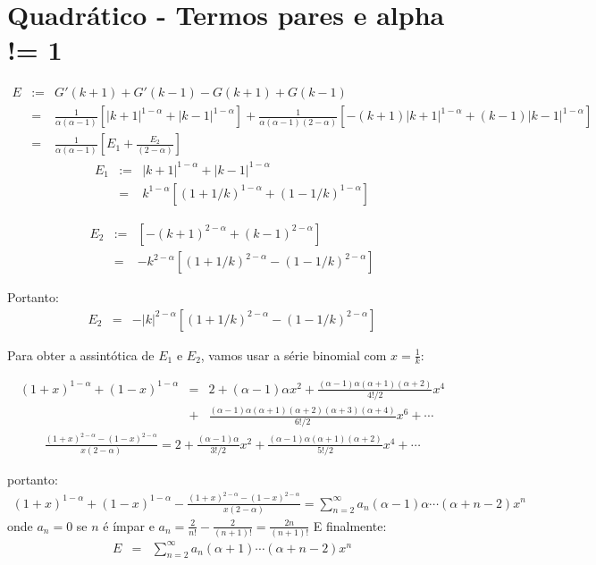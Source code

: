\documentclass[10pt,a4paper]{article}%
\begin{document}
\section{Quadrático - Termos pares e alpha != 1}
\begin{eqnarray*}
E&:=&  G'(k+1) + G'(k-1) - G(k+1) + G(k-1)\\
&=& \frac{1}{\alpha(\alpha-1)}\left[|k+1|^{1-\alpha} + |k-1|^{1-\alpha}\right] 
+ \frac{1}{\alpha(\alpha-1)(2-\alpha)}\left[-(k+1)|k+1|^{1-\alpha} + (k-1)|k-1|^{1-\alpha}\right]\\
&=& \frac{1}{\alpha(\alpha-1)}\left[E_1 + 
 \frac{E_2}{(2-\alpha)}\right]
\end{eqnarray*}
\begin{eqnarray*}
    E_1&:=&  |k+1|^{1-\alpha} + |k-1|^{1-\alpha}\\
&=&k^{1-\alpha}\left[(1+1/k)^{1-\alpha} + (1-1/k)^{1-\alpha}\right]
\end{eqnarray*}


\begin{eqnarray*}
    E_2&:=&  \left[-(k+1)^{2-\alpha} + (k-1)^{2-\alpha}\right]\\
    &=&-k^{2-\alpha}\left[(1+1/k)^{2-\alpha}-(1-1/k)^{2-\alpha}\right]
\end{eqnarray*}


Portanto:
\begin{eqnarray*}
    E_2
    &=&-|k|^{2-\alpha}\left[(1+1/k)^{2-\alpha}-(1-1/k)^{2-\alpha}\right]
\end{eqnarray*}


Para obter a assintótica de $E_1$ e $E_2$, vamos usar a série binomial com $x = \frac{1}{k}$:

\begin{eqnarray*}
    (1+x)^{1-\alpha} + (1-x)^{1-\alpha} &=& 2 + (\alpha - 1) \alpha x^2 + \frac{(\alpha - 1) \alpha (\alpha + 1) (\alpha + 2)}{4!/2} x^4\\ &+& \frac{(\alpha - 1) \alpha (\alpha + 1) (\alpha + 2) (\alpha + 3) (\alpha + 4)}{6!/2} x^6 +\cdots
\end{eqnarray*}
\begin{eqnarray*}
    \frac{(1+x)^{2-\alpha} -(1-x)^{2-\alpha}}{x(2-\alpha)} = 2 +\frac{(\alpha-1)\alpha}{3!/2}x^2 +\frac{(\alpha-1)\alpha(\alpha+1)(\alpha+2)}{5!/2}x^4 + \cdots
\end{eqnarray*}

portanto:
\begin{eqnarray*}
    (1+x)^{1-\alpha} + (1-x)^{1-\alpha} - \frac{(1+x)^{2-\alpha} - (1-x)^{2-\alpha}}{x(2-\alpha)} = \sum_{n=2}^\infty a_n(\alpha-1)\alpha\cdots (\alpha+n-2)x^n
\end{eqnarray*}
onde  $a_n=0$ se $n$ é ímpar e
$a_n = \frac{2}{n!}-\frac{2}{(n+1)!}=\frac{2n}{(n+1)!}$
E finalmente:
\begin{eqnarray*}
    E&=& \sum_{n=2}^\infty a_n(\alpha+1)\cdots (\alpha+n-2)x^n
\end{eqnarray*}
    
\end{document}
